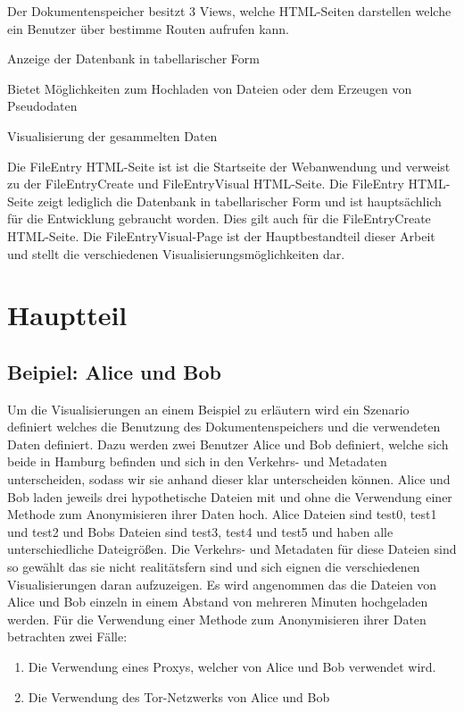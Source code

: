 \documentclass[
    fontsize=12pt,
    headings=small,
    parskip=half,           %
    bibliography=totoc,
    numbers=noenddot,       %
    open=any,               %
    ]{scrreprt}
\begin{document}
Der Dokumentenspeicher besitzt 3 Views, welche HTML-Seiten darstellen welche ein Benutzer über bestimme Routen aufrufen kann. 

\begin{description}[style=nextline] 
\item[/FileEntry] Anzeige der Datenbank in tabellarischer Form
\item[/FileEntryCreate] Bietet Möglichkeiten zum Hochladen von Dateien oder dem Erzeugen von Pseudodaten
\item[/FileEntryVisual] Visualisierung der gesammelten Daten
\end{description}

Die FileEntry HTML-Seite ist ist die Startseite der Webanwendung und verweist zu der FileEntryCreate und FileEntryVisual HTML-Seite.
Die FileEntry HTML-Seite zeigt lediglich die Datenbank in tabellarischer Form und ist hauptsächlich für die Entwicklung gebraucht worden. 
Dies gilt auch für die FileEntryCreate HTML-Seite. 
Die FileEntryVisual-Page ist der Hauptbestandteil dieser Arbeit und stellt die verschiedenen Visualisierungsmöglichkeiten dar.


\chapter{Hauptteil}

    \section{Beipiel: Alice und Bob}
Um die Visualisierungen an einem Beispiel zu erläutern wird ein Szenario definiert welches die Benutzung des Dokumentenspeichers und die verwendeten Daten definiert.
Dazu werden zwei Benutzer Alice und Bob definiert, welche sich beide in Hamburg befinden und sich in den Verkehrs- und Metadaten unterscheiden, sodass wir sie anhand dieser klar unterscheiden können.
Alice und Bob laden jeweils drei hypothetische Dateien mit und ohne die Verwendung einer Methode zum Anonymisieren ihrer Daten hoch.
Alice Dateien sind test0, test1 und test2 und Bobs Dateien sind test3, test4 und test5 und haben alle unterschiedliche Dateigrößen.
Die Verkehrs- und Metadaten für diese Dateien sind so gewählt das sie nicht realitätsfern sind und sich eignen die verschiedenen Visualisierungen daran aufzuzeigen. 
Es wird angenommen das die Dateien von Alice und Bob einzeln in einem Abstand von mehreren Minuten hochgeladen werden.
Für die Verwendung einer Methode zum Anonymisieren ihrer Daten betrachten zwei Fälle:
\begin{enumerate}
\item Die Verwendung eines Proxys, welcher von Alice und Bob verwendet wird.
\item Die Verwendung des Tor-Netzwerks von Alice und Bob
\end{enumerate}
\end{document}
